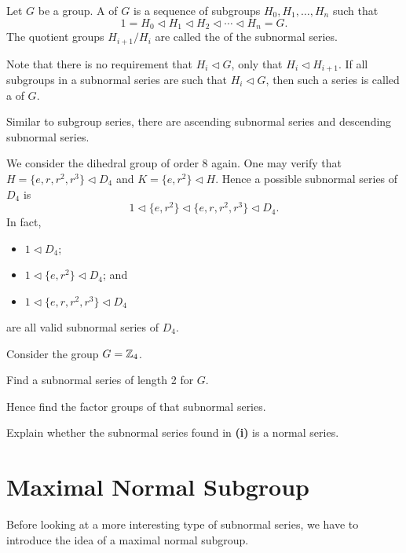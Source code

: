 \begin{definition}
    Let $G$ be a group. A  of $G$ is a sequence of subgroups $H_0, H_1, \dots, H_n$ such that
    \[
        1 = H_0 \lhd H_1 \lhd H_2 \lhd \cdots \lhd H_n = G.
    \]
    The quotient groups $H_{i+1}/H_i$ are called the  of the subnormal series.
\end{definition}
\begin{remark}
    Note that there is no requirement that $H_i \lhd G$, only that $H_i \lhd H_{i+1}$. If all subgroups in a subnormal series are such that $H_i \lhd G$, then such a series is called a  of $G$.
\end{remark}
\begin{remark}
    Similar to subgroup series, there are ascending subnormal series and descending subnormal series.
\end{remark}

\begin{example}
    We consider the dihedral group of order 8 again. One may verify that $H = \{e, r, r^2, r^3\} \lhd D_4$ and $K = \{e, r^2\} \lhd H$. Hence a possible subnormal series of $D_4$ is
    \[
        1 \lhd \{e, r^2\} \lhd \{e, r, r^2, r^3\} \lhd D_4.
    \]
    In fact,
    \begin{itemize}
        \item $1 \lhd D_4$;
        \item $1 \lhd \{e, r^2\} \lhd D_4$; and
        \item $1 \lhd \{e, r, r^2, r^3\} \lhd D_4$
    \end{itemize}
    are all valid subnormal series of $D_4$.
\end{example}

\begin{exercise}
    Consider the group $G = \mathbb{Z}_4$.
    \begin{partquestions}{\roman*}
        \item Find a subnormal series of length 2 for $G$.
        \item Hence find the factor groups of that subnormal series.
        \item Explain whether the subnormal series found in \textbf{(i)} is a normal series.
    \end{partquestions}
\end{exercise}

\section{Maximal Normal Subgroup}
Before looking at a more interesting type of subnormal series, we have to introduce the idea of a maximal normal subgroup.

